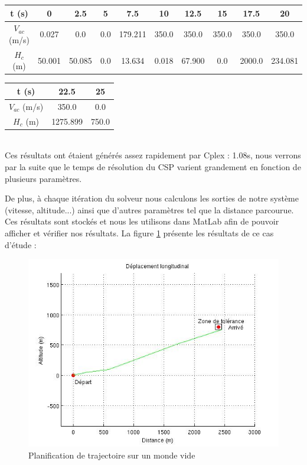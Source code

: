 \noindent
\begin{tabular}{|c|ccccccccc|}
	\hline t (s)& 0 & 2.5 & 5 & 7.5 & 10 & 12.5 & 15 & 17.5 & 20\\ 
	\hline $V_{ac}$ (m/s) & 0.027 & 0.0 & 0.0 & 179.211 & 350.0 & 350.0 & 350.0 & 350.0 & 350.0 \\ 
	\hline $H_c$ (m)& 50.001 & 50.085 & 0.0 & 13.634 & 0.018 & 67.900 & 0.0 & 2000.0 & 234.081 \\ 
	\hline 
\end{tabular}      
\begin{tabular}{|c|cc|}
	\hline t (s)& 22.5 & 25 \\ 
	\hline $V_{ac}$ (m/s) & 350.0 & 0.0 \\ 
	\hline $H_c$ (m)& 1275.899 & 750.0 \\ 
	\hline 
\end{tabular}\\

Ces résultats ont étaient générés assez rapidement par Cplex : 1.08s, nous verrons par la suite que le temps de résolution du CSP varient grandement en fonction de plusieurs paramètres.

De plus, à chaque itération du solveur nous calculons les sorties de notre système (vitesse, altitude...) ainsi que d'autres paramètres tel que la distance parcourue. Ces résultats sont stockés et nous les utilisons dans MatLab afin de pouvoir afficher et vérifier nos résultats. La figure \ref{fig:resultatCplex1} présente les résultats de ce cas d'étude :

\begin{figure}[h]
	\centering	
	\includegraphics[scale=0.54]{images/resultatCplex1.jpg}
	\caption{Planification de trajectoire sur un monde vide}
	\label{fig:resultatCplex1}
\end{figure}

